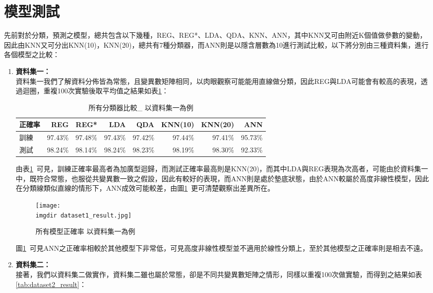 \section{模型測試}		
先前對於分類，預測之模型，總共包含以下幾種，REG、REG*、LDA、QDA、KNN、ANN，其中KNN又可由附近K個值做參數的變動，因此由KNN又可分出KNN(10)，KNN(20)，總共有7種分類器，而ANN則是以隱含層數為10進行測試比較，以下將分別由三種資料集，進行各個模型之比較：
\begin{enumerate}
\item{\textbf{資料集一：}\\
	資料集一我們了解資料分佈皆為常態，且變異數矩陣相同，以肉眼觀察可能能用直線做分類，因此REG與LDA可能會有較高的表現，透過迴圈，重複100次實驗後取平均值之結果如表\ref{tab:dataset1_result}：
	\begin{table}[H]				
		\caption{所有分類器比較\_ 以資料集一為例}\label{tab:dataset1_result}
		\centering
		\extrarowheight=10pt
		\begin{tabular}{lrrrrrrr} 					
		\hline
正確率   &REG &REG*    &LDA     &QDA     &KNN(10) &KNN(20) &ANN \\ \hline 
訓練& 97.43\% &97.48\% &97.43\% &97.42\% &97.44\% &97.41\% &95.73\%   \\ 	
測試& 98.24\% &98.14\% &98.24\% &98.23\% &98.19\% &98.30\% &92.33\%   \\ 		
		\hline					
		\end{tabular}
	\end{table}
由表\ref{tab:dataset1_result}\ 可見，訓練正確率最高者為加廣型迴歸，而測試正確率最高則是KNN(20)，而其中LDA與REG表現為次高者，可能由於資料集一中，既符合常態，也服從共變異數一致之假設，因此有較好的表現，而ANN則是處於墊底狀態，由於ANN較屬於高度非線性模型，因此在分類線類似直線的情形下，ANN成效可能較差，由圖\ref{fig:dataset1_result}\ 更可清楚觀察出差異所在。
\begin{figure}[H]	
		\centering	 			 	 
   		\texttt{[image: \\imgdir dataset1\_result.jpg]} 
   		\caption{所有模型正確率 以資料集一為例}
   		\label{fig:dataset1_result}   			 		 
	\end{figure}
	圖\ref{fig:dataset1_result}\ 可見ANN之正確率相較於其他模型下非常低，可見高度非線性模型並不適用於線性分類上，至於其他模型之正確率則是相去不遠。
}
\item{\textbf{資料集二：}\\
接著，我們以資料集二做實作，資料集二雖也屬於常態，卻是不同共變異數矩陣之情形，同樣以重複100次做實驗，而得到之結果如表\ref{tab:dataset2_result}：
\begin{table}[H]				

\end{table}}
\end{enumerate}
